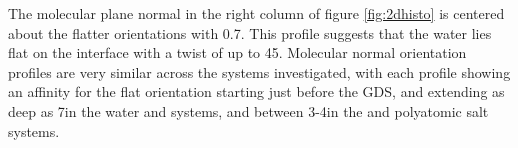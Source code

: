 
The molecular plane normal in the right column of figure \ref{fig:2dhisto} is centered about the flatter orientations with 0.7. This profile suggests that the water lies flat on the interface with a twist of up to 45\degree.  Molecular normal orientation profiles are very similar across the systems investigated, with each profile showing an affinity for the flat orientation starting just before the GDS, and extending as deep as 7\angs in the water and \nacl systems, and between 3-4\angs in the \sodnit and \sodsul polyatomic salt systems.

